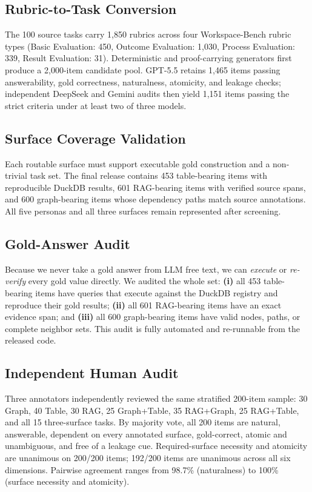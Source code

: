 \documentclass[11pt]{article}
\begin{document}
\subsection{Rubric-to-Task Conversion}
The 100 source tasks carry 1{,}850 rubrics across four Workspace-Bench rubric
types (Basic Evaluation: 450, Outcome Evaluation: 1{,}030, Process Evaluation:
339, Result Evaluation: 31). Deterministic and proof-carrying generators first
produce a 2{,}000-item candidate pool. GPT-5.5 retains 1{,}465 items passing
answerability, gold correctness, naturalness, atomicity, and leakage checks;
independent DeepSeek and Gemini audits then yield 1{,}151 items passing the
strict criteria under at least two of three models.

\subsection{Surface Coverage Validation}
Each routable surface must support executable gold construction and a
non-trivial task set. The final release contains 453 table-bearing items with
reproducible DuckDB results, 601 RAG-bearing items with verified source spans,
and 600 graph-bearing items whose dependency paths match source annotations.
All five personas and all three surfaces remain represented after screening.

\subsection{Gold-Answer Audit}
Because we never take a gold answer from LLM free text, we can \emph{execute}
or \emph{re-verify} every gold value directly. We audited the whole set:
\textbf{(i)} all 453 table-bearing items have queries that execute against the
DuckDB registry and reproduce their gold results; \textbf{(ii)} all 601
RAG-bearing items have an exact evidence span; and \textbf{(iii)} all 600
graph-bearing items have valid nodes, paths, or complete neighbor sets.
This audit is fully automated and re-runnable from the released code.

\subsection{Independent Human Audit}
Three annotators independently reviewed the same stratified 200-item sample:
30 Graph, 40 Table, 30 RAG, 25 Graph+Table, 35 RAG+Graph, 25 RAG+Table, and all
15 three-surface tasks. By majority vote, all 200 items are natural,
answerable, dependent on every annotated surface, gold-correct, atomic and
unambiguous, and free of a leakage cue. Required-surface necessity and
atomicity are unanimous on 200/200 items; 192/200 items are unanimous across
all six dimensions. Pairwise agreement ranges from 98.7\% (naturalness) to
100\% (surface necessity and atomicity).
\end{document}
